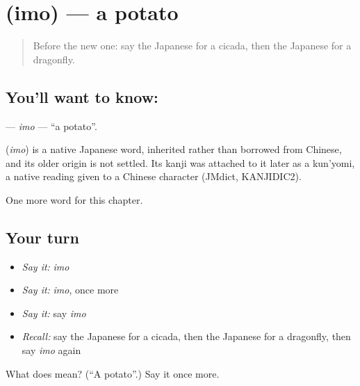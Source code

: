 \section[\texorpdfstring{\ja{いも} (imo)}{いも (imo)}]{ (imo) — a potato}

\label{lesson:JA-C65-imo}



\begin{quote}
Before the new one: say the Japanese for a cicada, then the Japanese for a dragonfly.
\end{quote}

\subsection*{You'll want to know: }
\textbf{} — \emph{imo} — \textquotedblleft{}a potato\textquotedblright{}.

\begin{cousinweb}
\textbf{} (\emph{imo}) is a native Japanese word, inherited rather than borrowed from Chinese, and its older origin is not settled. Its kanji was attached to it later as a kun'yomi, a native reading given to a Chinese character (JMdict, KANJIDIC2).
\end{cousinweb}

\begin{grammarlens}[title={What you've built}]
One more word for this chapter.
\end{grammarlens}

\subsection*{Your turn}
\begin{itemize}
\raggedright
  \item \emph{Say it:} \emph{imo}
  \item \emph{Say it:} \emph{imo}, once more
  \item \emph{Say it:} say \emph{imo}
  \item \emph{Recall:} say the Japanese for a cicada, then the Japanese for a dragonfly, then say \emph{imo} again
\end{itemize}

\begin{tcolorbox}[breakable,colback=teal!4,colframe=teal!35!black,title={Before you move on}]
What does  mean? (\textquotedblleft{}A potato\textquotedblright{}.) Say it once more.
\end{tcolorbox}
